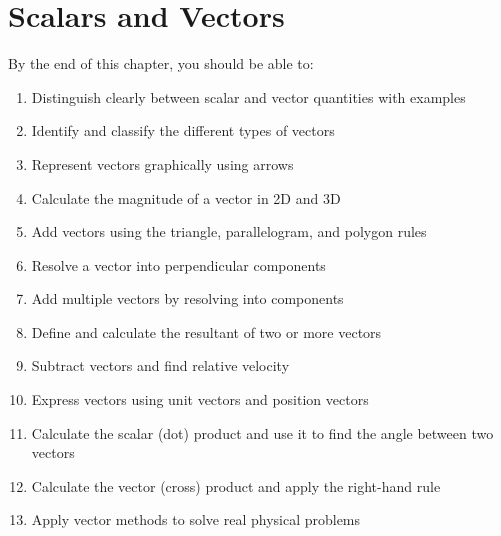 %

\chapter{Scalars and Vectors}
\label{ch:scalars_vectors}


\begin{objectivebox}
By the end of this chapter, you should be able to:
\begin{enumerate}[noitemsep]
  \item Distinguish clearly between scalar and vector
  quantities with examples
  \item Identify and classify the different types of vectors
  \item Represent vectors graphically using arrows
  \item Calculate the magnitude of a vector in 2D and 3D
  \item Add vectors using the triangle, parallelogram,
  and polygon rules
  \item Resolve a vector into perpendicular components
  \item Add multiple vectors by resolving into components
  \item Define and calculate the resultant of two or more
  vectors
  \item Subtract vectors and find relative velocity
  \item Express vectors using unit vectors and position vectors
  \item Calculate the scalar (dot) product and use it to
  find the angle between two vectors
  \item Calculate the vector (cross) product and apply
  the right-hand rule
  \item Apply vector methods to solve real physical problems
\end{enumerate}
\end{objectivebox}

\vspace{0.4cm}

\minitoc

